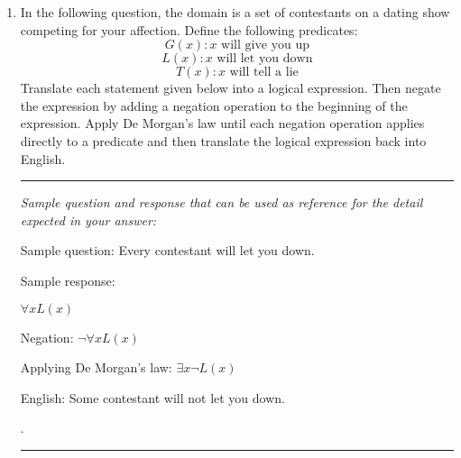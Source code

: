 \documentclass[12pt, oneside]{article}
\begin{document}
\begin{enumerate}
\item In the following question, the domain is a set of contestants on a dating show competing for your affection. Define the following predicates:
\[
    G(x): x \text{ will give you up} 
\]
\[
    L(x): x \text{ will let you down}
\]
\[
    T(x): x \text{ will tell a lie}
\]
Translate each statement given below into a logical expression. Then negate the expression by adding a negation operation to the beginning of the expression. Apply De Morgan's law until each negation operation applies directly to a predicate and then translate the logical expression back into English.



\rule{0.5\textwidth}{.4pt}

{\it Sample question and response that can be used as reference for the detail expected 
in your answer:

Sample question: Every contestant will let you down.

Sample response:

    $\forall x L(x)$
    
    Negation: $\neg \forall x L(x)$
    
    Applying De Morgan's law: $\exists x \neg L(x)$
    
    English: Some contestant will not let you down.

} .

\rule{0.5\textwidth}{.4pt}



\end{enumerate}
\end{document}
